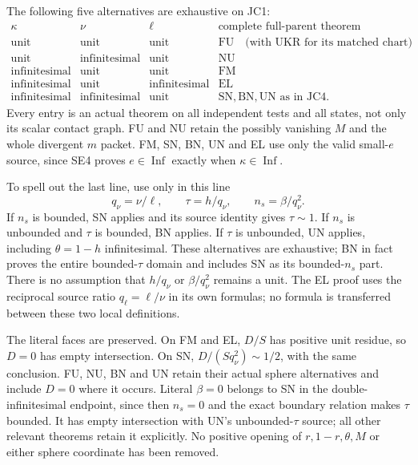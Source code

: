 The following five alternatives are exhaustive on JC1:
\[
\begin{array}{c|c|c|l}
 \kappa&\nu&\ell&\text{complete full-parent theorem}\\ \hline
 \text{unit}&\text{unit}&\text{unit}&\mathrm{FU}\quad
       \text{(with UKR for its matched chart)}\\
 \text{unit}&\text{infinitesimal}&\text{unit}&\mathrm{NU}\\
 \text{infinitesimal}&\text{unit}&\text{unit}&\mathrm{FM}\\
 \text{infinitesimal}&\text{unit}&\text{infinitesimal}&\mathrm{EL}\\
 \text{infinitesimal}&\text{infinitesimal}&\text{unit}
       &\mathrm{SN},\mathrm{BN},\mathrm{UN}\text{ as in JC4}.
\end{array}                                                     \tag{JC3}
\]
Every entry is an actual theorem on all independent tests and all
states, not only its scalar contact graph.  FU and NU retain the
possibly vanishing $M$ and the whole divergent $m$ packet.
FM, SN, BN, UN and EL use only the valid small-$e$ source, since
SE4 proves $e\in\operatorname{Inf}$ exactly when
$\kappa\in\operatorname{Inf}$.

To spell out the last line, use only in this line
\[
 q_\nu=\nu/\ell,\qquad \tau=h/q_\nu,
 \qquad n_s=\beta/q_\nu^2.                         \tag{JC4}
\]
If $n_s$ is bounded, SN applies and its source identity gives
$\tau\sim1$.  If $n_s$ is unbounded and $\tau$ is bounded,
BN applies.  If $\tau$ is unbounded, UN applies, including
$\theta=1-h$ infinitesimal.  These alternatives are exhaustive;
BN in fact proves the entire bounded-$\tau$ domain and includes
SN as its bounded-$n_s$ part.  There is no assumption that
$h/q_\nu$ or $\beta/q_\nu^2$ remains a unit.  The EL proof uses
the reciprocal source ratio $q_\ell=\ell/\nu$ in its own formulas;
no formula is transferred between these two local definitions.

The literal faces are preserved.  On FM and EL, $D/S$ has positive
unit residue, so $D=0$ has empty intersection.  On SN,
$D/(Sq_\nu^2)\sim1/2$, with the same conclusion.  FU, NU, BN and
UN retain their actual sphere alternatives and include $D=0$
where it occurs.  Literal $\beta=0$ belongs to SN in the
double-infinitesimal endpoint, since then $n_s=0$ and the exact
boundary relation makes $\tau$ bounded.  It has empty intersection
with UN's unbounded-$\tau$ source; all other relevant theorems
retain it explicitly.  No positive opening of $r,1-r,\theta,M$
or either sphere coordinate has been removed.

